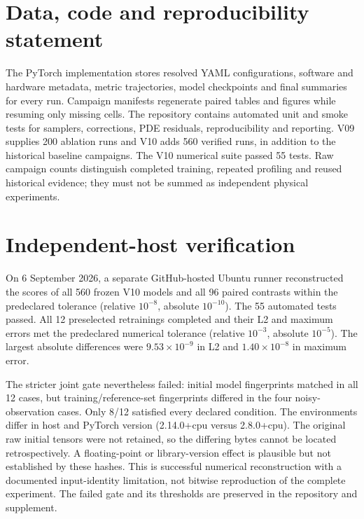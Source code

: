 \documentclass[
  11pt,
]{article}
\begin{document}
\hypertarget{data-code-and-reproducibility-statement}{%
\section{Data, code and reproducibility
statement}\label{data-code-and-reproducibility-statement}}

The PyTorch implementation stores resolved YAML configurations, software
and hardware metadata, metric trajectories, model checkpoints and final
summaries for every run. Campaign manifests regenerate paired tables and
figures while resuming only missing cells. The repository contains
automated unit and smoke tests for samplers, corrections, PDE residuals,
reproducibility and reporting. V09 supplies 200 ablation runs and V10
adds 560 verified runs, in addition to the historical baseline
campaigns. The V10 numerical suite passed 55 tests. Raw campaign counts
distinguish completed training, repeated profiling and reused historical
evidence; they must not be summed as independent physical experiments.

\hypertarget{independent-host-verification}{%
\section{Independent-host
verification}\label{independent-host-verification}}

On 6 September 2026, a separate GitHub-hosted Ubuntu runner
reconstructed the scores of all 560 frozen V10 models and all 96 paired
contrasts within the predeclared tolerance (relative \(10^{-8}\),
absolute \(10^{-10}\)). The 55 automated tests passed. All 12
preselected retrainings completed and their L2 and maximum errors met
the predeclared numerical tolerance (relative \(10^{-3}\), absolute
\(10^{-5}\)). The largest absolute differences were
\(9.53\times10^{-9}\) in L2 and \(1.40\times10^{-8}\) in maximum error.

The stricter joint gate nevertheless failed: initial model fingerprints
matched in all 12 cases, but training/reference-set fingerprints
differed in the four noisy-observation cases. Only 8/12 satisfied every
declared condition. The environments differ in host and PyTorch version
(2.14.0+cpu versus 2.8.0+cpu). The original raw initial tensors were not
retained, so the differing bytes cannot be located retrospectively. A
floating-point or library-version effect is plausible but not
established by these hashes. This is successful numerical reconstruction
with a documented input-identity limitation, not bitwise reproduction of
the complete experiment. The failed gate and its thresholds are
preserved in the repository and supplement.
\end{document}
